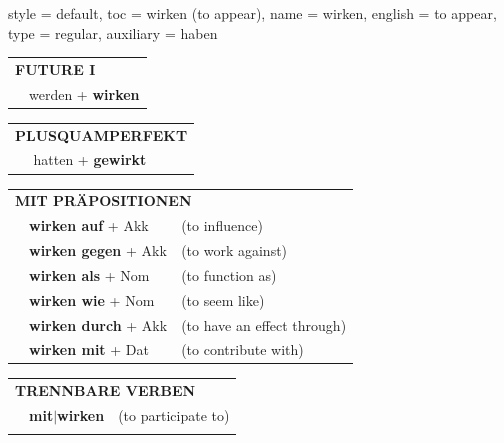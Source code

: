 \begin{verbentry}{
  style = {default},
  toc = {wirken (to appear)},
  name = {wirken},
  english = {to appear},
  type = {regular},
  auxiliary = {haben}
}
\begin{tabular}{rl}
    \multicolumn{2}{l}{\textbf{FUTURE I} }\\
  &  werden + \textbf{wirken}\\
 
  \end{tabular}
\hfill
   \begin{tabular}{rl}
      \multicolumn{2}{l}{\textbf{PLUSQUAMPERFEKT}}\\
  &  hatten + \textbf{gewirkt}\\
  \end{tabular}

   \vspace{10pt}

   \begin{tabular}{lll}
      \multicolumn{3}{l}{\textbf{MIT PRÄPOSITIONEN}}\\
& \textbf{wirken auf} + Akk & (to influence)\\
& \textbf{wirken gegen} + Akk & (to work against)\\
&\textbf{wirken als} + Nom & (to function as)\\
&\textbf{wirken wie} + Nom & (to seem like)\\
&\textbf{wirken durch} + Akk & (to have an effect through)\\
&\textbf{wirken mit} + Dat & (to contribute with)
  \end{tabular}
  \hfill
   \begin{tabular}{lll}
      \multicolumn{3}{l}{\textbf{TRENNBARE VERBEN}}\\
 & \textbf{mit$|$wirken} & (to participate to)\\
\vspace{40pt}
  \end{tabular}


  \vspace{-5pt}
\end{verbentry}

